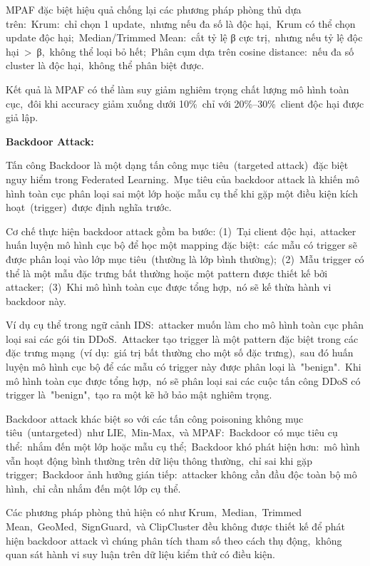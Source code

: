 MPAF đặc biệt hiệu quả chống lại các phương pháp phòng thủ dựa trên:~Krum:~chỉ chọn 1 update,~nhưng nếu đa số là độc hại,~Krum có thể chọn update độc hại;~Median/Trimmed Mean:~cắt tỷ lệ β cực trị,~nhưng nếu tỷ lệ độc hại~\textgreater~β,~không thể loại bỏ hết;~Phân cụm dựa trên cosine distance:~nếu đa số cluster là độc hại,~không thể phân biệt được.

Kết quả là MPAF có thể làm suy giảm nghiêm trọng chất lượng mô hình toàn cục,~đôi khi accuracy giảm xuống dưới 10\%~chỉ với 20\%--30\%~client độc hại được giả lập.

\textbf{Backdoor Attack:}

Tấn công Backdoor là một dạng tấn công mục tiêu~(targeted attack)~đặc biệt nguy hiểm trong Federated Learning.~Mục tiêu của backdoor attack là khiến mô hình toàn cục phân loại sai một lớp hoặc mẫu cụ thể khi gặp một điều kiện kích hoạt~(trigger)~được định nghĩa trước.

Cơ chế thực hiện backdoor attack gồm ba bước: (1)~Tại client độc hại,~attacker huấn luyện mô hình cục bộ để học một mapping đặc biệt:~các mẫu có trigger sẽ được phân loại vào lớp mục tiêu~(thường là lớp bình thường);~(2)~Mẫu trigger có thể là một mẫu đặc trưng bất thường hoặc một pattern được thiết kế bởi attacker;~(3)~Khi mô hình toàn cục được tổng hợp,~nó sẽ kế thừa hành vi backdoor này.

Ví dụ cụ thể trong ngữ cảnh IDS:~attacker muốn làm cho mô hình toàn cục phân loại sai các gói tin DDoS.~Attacker tạo trigger là một pattern đặc biệt trong các đặc trưng mạng~(ví dụ:~giá trị bất thường cho một số đặc trưng),~sau đó huấn luyện mô hình cục bộ để các mẫu có trigger này được phân loại là~"benign".~Khi mô hình toàn cục được tổng hợp,~nó sẽ phân loại sai các cuộc tấn công DDoS có trigger là~"benign",~tạo ra một kẽ hở bảo mật nghiêm trọng.

Backdoor attack khác biệt so với các tấn công poisoning không mục tiêu~(untargeted)~như LIE,~Min-Max,~và MPAF:~Backdoor có mục tiêu cụ thể:~nhắm đến một lớp hoặc mẫu cụ thể;~Backdoor khó phát hiện hơn:~mô hình vẫn hoạt động bình thường trên dữ liệu thông thường,~chỉ sai khi gặp trigger;~Backdoor ảnh hưởng gián tiếp:~attacker không cần đầu độc toàn bộ mô hình,~chỉ cần nhắm đến một lớp cụ thể.

Các phương pháp phòng thủ hiện có như Krum,~Median,~Trimmed Mean,~GeoMed,~SignGuard,~và ClipCluster đều không được thiết kế để phát hiện backdoor attack vì chúng phân tích tham số theo cách thụ động,~không quan sát hành vi suy luận trên dữ liệu kiểm thử có điều kiện.

